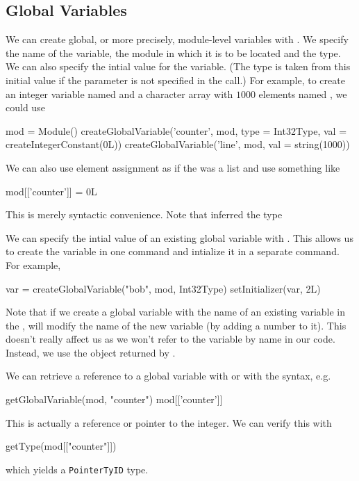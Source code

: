 \subsection{Global Variables}
We can create global, or more precisely, module-level 
variables with .
We specify the name of the variable, the module in which it is
to be located and the type.
We can also specify the intial value for the variable.
(The type is taken from this initial value if the 
parameter is not specified in the call.)
For example, to create an integer variable named 
and a character array with $1000$ elements named ,
we could use
\begin{RCode}
mod = Module()
createGlobalVariable('counter', mod, type = Int32Type, 
                      val = createIntegerConstant(0L))
createGlobalVariable('line', mod, val = string(1000))
\end{RCode}
We can also use element assignment as if the 
 was a list and use something like
\begin{RCode}
mod[['counter']] = 0L
\end{RCode}
This is merely syntactic convenience. Note
that  inferred the type

We can specify the intial value of an existing 
global variable with  .
This allows us to create the variable in one command
and intialize it in a separate command.
For example,
\begin{RCode}
var = createGlobalVariable("bob", mod, Int32Type)
setInitializer(var, 2L)
\end{RCode}

Note that if we create a global variable with the name of an existing
variable in the , \llvm{} will modify the name of the
new variable (by adding a number to it).  This doesn't really affect
us as we won't refer to the variable by name in our code. Instead, we
use the object returned by .


We can retrieve a reference to a global variable with
 or with the \Rop{[[} syntax, e.g.
\begin{RCode}
getGlobalVariable(mod, "counter")
mod[['counter']]
\end{RCode}
This is actually a reference or pointer to the integer.
We can verify this with
\begin{RCode}
getType(mod[["counter"]])
\end{RCode}
which yields a \texttt{PointerTyID} type.

